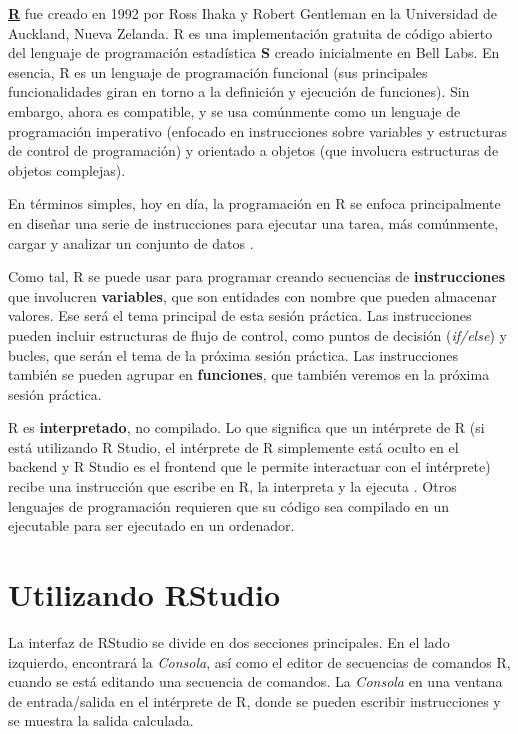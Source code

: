 \documentclass[
]{book}
\begin{document}
\textbf{\href{https://www.r-project.org/}{R}} fue creado en 1992 por Ross Ihaka y Robert Gentleman en la Universidad de Auckland, Nueva Zelanda. R es una implementación gratuita de código abierto del lenguaje de programación estadística \textbf{S} creado inicialmente en Bell Labs. En esencia, R es un lenguaje de programación funcional (sus principales funcionalidades giran en torno a la definición y ejecución de funciones). Sin embargo, ahora es compatible, y se usa comúnmente como un lenguaje de programación imperativo (enfocado en instrucciones sobre variables y estructuras de control de programación) y orientado a objetos (que involucra estructuras de objetos complejas).

En términos simples, hoy en día, la programación en R se enfoca principalmente en diseñar una serie de instrucciones para ejecutar una tarea, más comúnmente, cargar y analizar un conjunto de datos \citep{wickham2017datascience}.

Como tal, R se puede usar para programar creando secuencias de \textbf{instrucciones} que involucren \textbf{variables}, que son entidades con nombre que pueden almacenar valores. Ese será el tema principal de esta sesión práctica. Las instrucciones pueden incluir estructuras de flujo de control, como puntos de decisión (\emph{if/else}) y bucles, que serán el tema de la próxima sesión práctica. Las instrucciones también se pueden agrupar en \textbf{funciones}, que también veremos en la próxima sesión práctica.

R es \textbf{interpretado}, no compilado. Lo que significa que un intérprete de R (si está utilizando R Studio, el intérprete de R simplemente está oculto en el backend y R Studio es el frontend que le permite interactuar con el intérprete) recibe una instrucción que escribe en R, la interpreta y la ejecuta . Otros lenguajes de programación requieren que su código sea compilado en un ejecutable para ser ejecutado en un ordenador.

\hypertarget{utilizando-rstudio}{%
\section{Utilizando RStudio}\label{utilizando-rstudio}}

La interfaz de RStudio se divide en dos secciones principales. En el lado izquierdo, encontrará la \emph{Consola}, así como el editor de secuencias de comandos R, cuando se está editando una secuencia de comandos. La \emph{Consola} en una ventana de entrada/salida en el intérprete de R, donde se pueden escribir instrucciones y se muestra la salida calculada.
\end{document}
